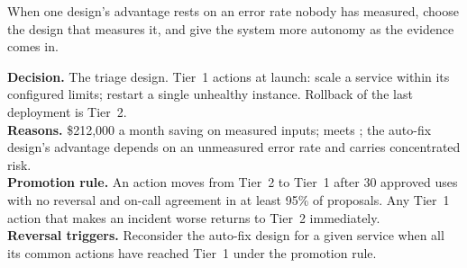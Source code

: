 \begin{keyidea}
When one design's advantage rests on an error rate nobody has measured, choose the design that measures it, and give the system more autonomy as the evidence comes in.
\end{keyidea}

\begin{tcolorbox}[colback=white, colframe=black!45, boxrule=0.4pt, arc=1pt, fontupper=\small, title={DR-INC-001: The triage design, with tiered safe actions}, fonttitle=\bfseries\small, coltitle=black, colbacktitle=codefill]
\textbf{Decision.} The triage design. Tier~1 actions at launch: scale a service within its configured limits; restart a single unhealthy instance. Rollback of the last deployment is Tier~2.\\
\textbf{Reasons.} \$212{,}000 a month saving on measured inputs; meets ; the auto-fix design's advantage depends on an unmeasured error rate and carries concentrated risk.\\
\textbf{Promotion rule.} An action moves from Tier~2 to Tier~1 after 30 approved uses with no reversal and on-call agreement in at least 95\% of proposals. Any Tier~1 action that makes an incident worse returns to Tier~2 immediately.\\
\textbf{Reversal triggers.} Reconsider the auto-fix design for a given service when all its common actions have reached Tier~1 under the promotion rule.
\end{tcolorbox}
